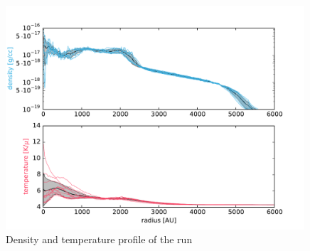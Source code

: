 \begin{figure}[!htb]
 \centering
 \includegraphics[width=0.99\textwidth]{Figures/var_rt_profiles/timeave_n1c1_6000AU}
 \captionsetup{justification=justified,singlelinecheck=false,width=\linewidth}
 \decoRule
 \caption[ profiles]{Density and temperature profile of the  run}
\label{fig:n1c1.0_profile}
\end{figure}
\FloatBarrier


